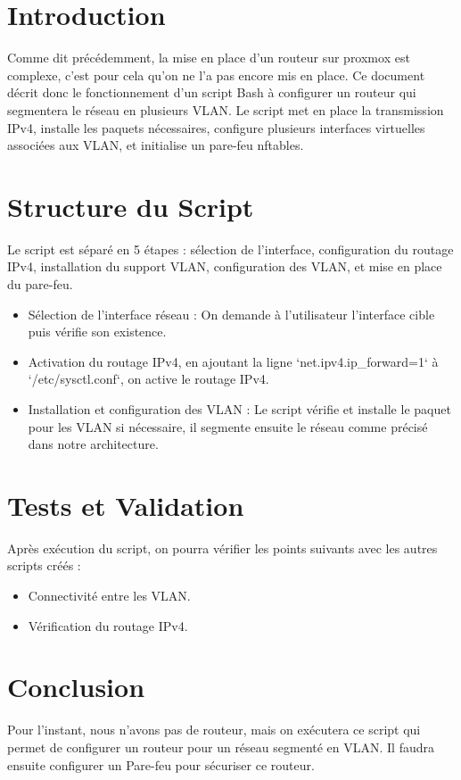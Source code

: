 \documentclass[../../file.tex]{subfiles}
\begin{document}
\section{Introduction}
Comme dit précédemment, la mise en place d'un routeur sur proxmox est complexe, c'est pour cela qu'on ne l'a pas encore mis en place. Ce document décrit donc le fonctionnement d'un script Bash à configurer un routeur qui segmentera le réseau en plusieurs VLAN. Le script met en place la transmission IPv4, installe les paquets nécessaires, configure plusieurs interfaces virtuelles associées aux VLAN, et initialise un pare-feu nftables.

\section{Structure du Script}
Le script est séparé en 5 étapes : sélection de l’interface, configuration du routage IPv4, installation du support VLAN, configuration des VLAN, et mise en place du pare-feu.
\begin{itemize}
    \item Sélection de l’interface réseau : On demande à l'utilisateur l'interface cible puis vérifie son existence.
    \item Activation du routage IPv4, en ajoutant la ligne `net.ipv4.ip_forward=1` à `/etc/sysctl.conf`, on active le routage IPv4.
    \item Installation et configuration des VLAN : Le script vérifie et installe le paquet pour les VLAN si nécessaire, il segmente ensuite le réseau comme précisé dans notre architecture.
\end{itemize}

\section{Tests et Validation}
Après exécution du script, on pourra vérifier les points suivants avec les autres scripts créés :
\begin{itemize}
    \item Connectivité entre les VLAN.
    \item Vérification du routage IPv4.
\end{itemize}

\section{Conclusion}
Pour l'instant, nous n'avons pas de routeur, mais on exécutera ce script qui permet de configurer un routeur pour un réseau segmenté en VLAN. Il faudra ensuite configurer un Pare-feu pour sécuriser ce routeur.
\end{document}
